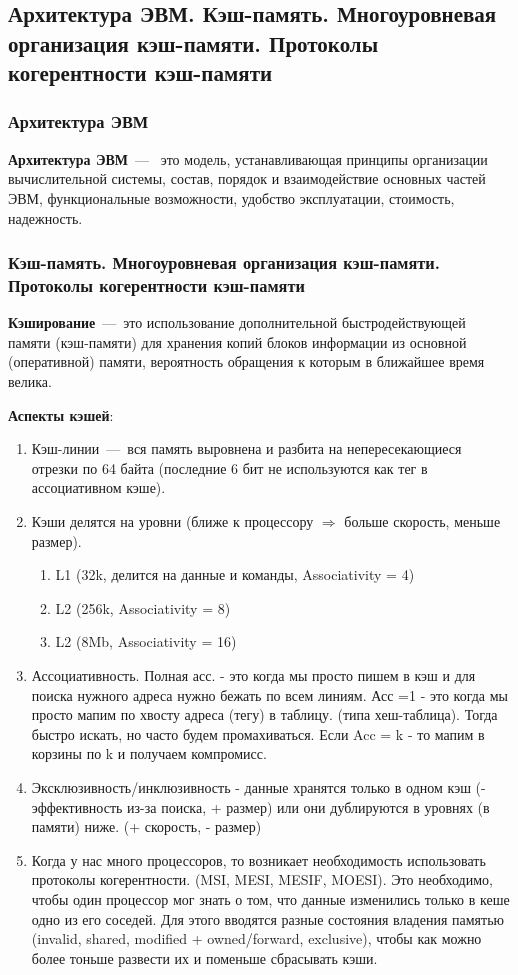\subsection{Архитектура ЭВМ. Кэш-память. Многоуровневая организация кэш-памяти. Протоколы когерентности кэш-памяти}

\subsubsection{Архитектура ЭВМ}
\textbf{Архитектура ЭВМ}~---~
это модель, устанавливающая принципы организации вычислительной системы, состав, 
порядок и взаимодействие основных частей ЭВМ, функциональные возможности, 
удобство эксплуатации, стоимость, надежность.

\subsubsection{Кэш-память. Многоуровневая организация кэш-памяти. Протоколы когерентности кэш-памяти}
\textbf{Кэширование}~---~это использование дополнительной быстродействующей памяти (кэш-памяти) для хранения копий блоков информации из основной (оперативной) памяти, вероятность обращения к которым в ближайшее время велика.

\textbf{Аспекты кэшей}:
\begin{enumerate}
	\item Кэш-линии~---~вся память выровнена и разбита на непересекающиеся отрезки по 64 байта (последние 6 бит не используются как тег в ассоциативном кэше). 
	\item Кэши делятся на уровни (ближе к процессору $\Rightarrow$ больше скорость, меньше размер). 
	\begin{enumerate}
		\item L1 (32k, делится на данные и команды, Associativity = 4)
		\item L2 (256k, Associativity = 8)
		\item L2 (8Mb, Associativity = 16)
	\end{enumerate}
	\item Ассоциативность. Полная асс. - это когда мы просто пишем в кэш и для поиска нужного адреса нужно бежать по всем линиям. Асс =1 - это когда мы просто мапим по хвосту адреса (тегу) в таблицу. (типа хеш-таблица). Тогда быстро искать, но часто будем промахиваться. Если Acc = k - то мапим в корзины по k и получаем компромисс.
	\item  Эксклюзивность/инклюзивность - данные хранятся только в одном кэш (- эффективность из-за поиска, + размер) или они дублируются в уровнях (в памяти) ниже. (+ скорость, - размер)
	\item Когда у нас много процессоров, то возникает необходимость использовать протоколы когерентности. (MSI, MESI, MESIF, MOESI). Это необходимо, чтобы один процессор мог знать о том, что данные изменились только в кеше одно из его соседей. Для этого вводятся разные состояния владения памятью (invalid, shared, modified + owned/forward, exclusive), чтобы как можно более тоньше развести их и поменьше сбрасывать кэши.
\end{enumerate}

